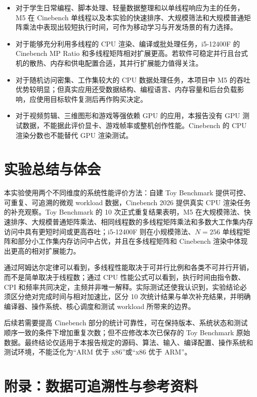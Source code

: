 \documentclass[UTF8,a4paper,12pt]{ctexart}
\begin{document}
\begin{itemize}
\item 对于学生日常编程、脚本处理、轻量数据整理和以单线程响应为主的任务，M5 在 Cinebench 单线程以及本实验的快速排序、大规模筛法和大规模普通矩阵乘法中表现出较短执行时间，可作为移动学习与开发场景的有力选择。
\item 对于能够充分利用多线程的 CPU 渲染、编译或批处理任务，i5-12400F 的 Cinebench MP Ratio 和多线程矩阵相对扩展更高。若软件可稳定并行且台式机的散热、内存和供电配置合适，其并行扩展能力值得关注。
\item 对于随机访问密集、工作集较大的 CPU 数据处理任务，本项目中 M5 的吞吐优势较明显；但真实应用还受数据结构、编程语言、内存容量和后台负载影响，应使用目标软件复测后再作购买决定。
\item 对于视频剪辑、三维图形和游戏等强依赖 GPU 的应用，本报告没有 GPU 测试数据，不能据此评价显卡、游戏帧率或整机创作性能。Cinebench 的 CPU 渲染分数也不能替代 GPU 渲染测试。
\end{itemize}

\section{实验总结与体会}

本实验使用两个不同维度的系统性能评价方法：自建 Toy Benchmark 提供可控、可重复、可追溯的微观 workload 数据，Cinebench 2026 提供真实 CPU 渲染任务的补充观察。Toy Benchmark 的 10 次正式重复结果表明，M5 在大规模筛法、快速排序、大规模普通矩阵乘法、相同线程数的多线程矩阵乘法和多数大工作集内存访问中具有更短时间或更高吞吐；i5-12400F 则在小规模筛法、$N=256$ 单线程矩阵和部分小工作集内存访问中占优，并且在多线程矩阵和 Cinebench 渲染中体现出更高的相对扩展能力。

通过阿姆达尔定律可以看到，多线程性能取决于可并行比例和各类不可并行开销，而不是简单取决于线程数；通过 CPU 性能公式可以看到，执行时间由指令数、CPI 和频率共同决定，主频并非唯一解释。实际测试还使我认识到，实验结论必须区分绝对完成时间与相对加速比，区分 10 次统计结果与单次补充结果，并明确编译器、操作系统、核心调度和测试 workload 所带来的边界。

后续若需要提高 Cinebench 部分的统计可靠性，可在保持版本、系统状态和测试顺序一致的条件下增加重复次数；但不应修改本次已保存的 Toy Benchmark 原始数据。最终结论仅适用于本报告规定的源码、算法、输入、编译配置、操作系统和测试环境，不能泛化为“ARM 优于 x86”或“x86 优于 ARM”。

\section{附录：数据可追溯性与参考资料}
\end{document}
